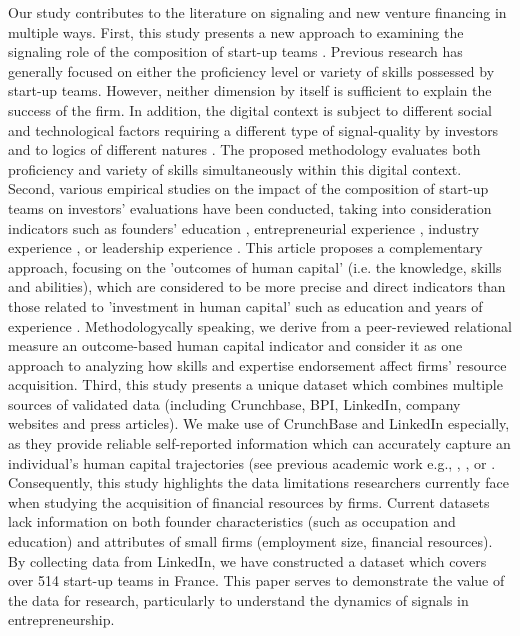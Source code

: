 \documentclass[12pt]{article}
\begin{document}
Our study contributes to the literature on signaling and new venture financing in multiple ways. First, this study presents a new approach to examining the signaling role of the composition of start-up teams \citep{beckman2007early}. Previous research has generally focused on either the proficiency level or variety of skills possessed by start-up teams. However, neither dimension by itself is sufficient to explain the success of the firm. In addition, the digital context is subject to different social and technological factors requiring a different type of signal-quality by investors and to logics of different natures \citep{nambisan2017digital}. The proposed methodology evaluates both proficiency and variety of skills simultaneously within this digital context. Second, various empirical studies on the impact of the composition of start-up teams on investors' evaluations have been conducted, taking into consideration indicators such as founders' education \citep{franke2008venture}, entrepreneurial experience \citep{beckman2007early}, industry experience \citep{becker2015new}, or leadership experience \citep{hoenig2015quality}. This article proposes a complementary approach, focusing on the 'outcomes of human capital' (i.e. the knowledge, skills and abilities), which are considered to be more precise and direct indicators than those related to 'investment in human capital' such as education and years of experience \citep{unger2011human, marvel2016human}. Methodologycally speaking, we derive from a peer-reviewed relational measure an outcome-based human capital indicator and consider it as one approach to analyzing how skills and expertise endorsement affect firms' resource acquisition. Third, this study presents a unique dataset which combines multiple sources of validated data (including Crunchbase, BPI, LinkedIn, company websites and press articles). We make use of CrunchBase and LinkedIn especially, as they provide reliable self-reported information which can accurately capture an individual's human capital trajectories (see previous academic work e.g., \citet{sako2020scaling}, \citet{rapanta2017linkedin}, or \citet{reese2020should}. Consequently, this study highlights the data limitations researchers currently face when studying the acquisition of financial resources by firms. Current datasets lack information on both founder characteristics (such as occupation and education) and attributes of small firms (employment size, financial resources). By collecting data from LinkedIn, we have constructed a dataset which covers over 514 start-up teams in France. This paper serves to demonstrate the value of the data for research, particularly to understand the dynamics of signals in entrepreneurship.
\end{document}
